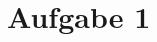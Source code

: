 \documentclass[12pt, a4paper,parskip]{scrartcl}
\begin{document}
\section{Aufgabe 1}

	
\end{document}
